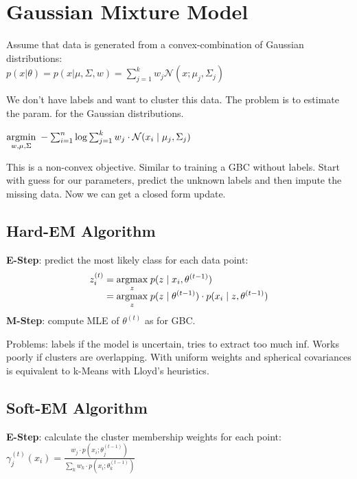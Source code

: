 \section*{Gaussian Mixture Model}

Assume that data is generated from a convex-combination of Gaussian distributions: \\[-8pt]

$p(x  | \theta) = p(x  | \mu, \Sigma, w) = \sum_{j=1}^k w_j \mathcal{N}(x; \mu_j, \Sigma_j)$

We don't have labels and want to cluster this data. The problem is to estimate the param. for the Gaussian distributions.

\quad $\underset{w, \mu, \Sigma}{\text{argmin}} \; - \sum_{i=1}^n \log \sum_{j=1}^k w_j \cdot \mathcal{N}(x_i \; | \; \mu_j, \Sigma_j)$

This is a non-convex objective. Similar to training a GBC without labels. Start with guess for our parameters, predict the unknown labels and then impute the missing data. Now we can get a closed form update.

\subsection*{Hard-EM Algorithm}

\textbf{E-Step}: predict the most likely class for each data point:
\begin{align*}
	z_i^{(t)} &= \underset{z}{\text{argmax}} \; p(z \; | \; x_i, \theta^{(t-1)}) \\[-5pt]
	&= \underset{z}{\text{argmax}} \; p(z \; | \; \theta^{(t-1)}) \cdot p(x_i \; | \; z, \theta^{(t-1)})
\end{align*}
\textbf{M-Step}: compute MLE of $\theta^{(t)}$ as for GBC. \smallskip

Problems: labels if the model is uncertain, tries to extract too much inf. Works poorly if clusters are overlapping. With uniform weights and spherical covariances is equivalent to k-Means with Lloyd's heuristics.

\subsection*{Soft-EM Algorithm}

\textbf{E-Step}: calculate the cluster membership weights for each point: \\[-10pt]

\qquad \qquad $\gamma_j^{(t)}(x_i) = \frac{w_j \cdot p(x_i ; \theta_j^{(t-1)})}{\sum_k w_k \cdot p(x_i ; \theta_k^{(t-1)})}$
		
